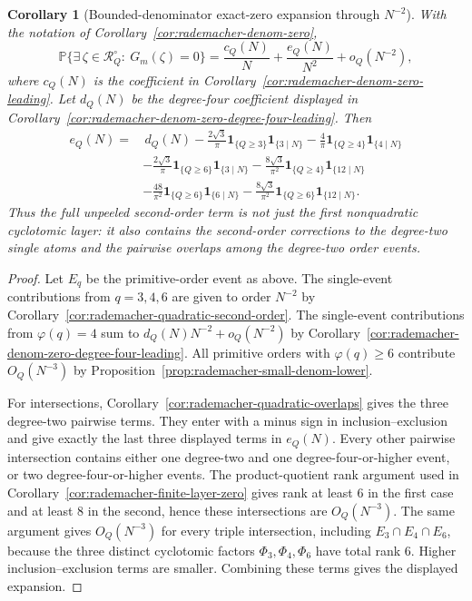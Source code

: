 \documentclass[11pt]{amsart}
\numberwithin{equation}{section}
\newtheorem{corollary}[theorem]{Corollary}
\theoremstyle{definition}
\theoremstyle{remark}
\newcommand{\Prob}{\mathbb P}
\begin{document}
\begin{corollary}[Bounded-denominator exact-zero expansion through \(N^{-2}\)]
\label{cor:rademacher-denom-zero-second-order}
With the notation of Corollary~\ref{cor:rademacher-denom-zero},
\[
  \Prob\{\exists\,\zeta\in\mathcal R_Q^\circ:\ G_m(\zeta)=0\}
  =\frac{c_Q(N)}{N}+\frac{e_Q(N)}{N^2}+o_Q(N^{-2}),
\]
where \(c_Q(N)\) is the coefficient in
Corollary~\ref{cor:rademacher-denom-zero-leading}.  Let \(d_Q(N)\) be the
degree-four coefficient displayed in
Corollary~\ref{cor:rademacher-denom-zero-degree-four-leading}.  Then
\[
\begin{aligned}
  e_Q(N)=&\,d_Q(N)
  -\frac{2\sqrt3}{\pi}\mathbf1_{\{Q\ge3\}}\mathbf1_{\{3\mid N\}}
  -\frac4\pi\mathbf1_{\{Q\ge4\}}\mathbf1_{\{4\mid N\}}  \\
  &-\frac{2\sqrt3}{\pi}\mathbf1_{\{Q\ge6\}}\mathbf1_{\{3\mid N\}}
  -\frac{8\sqrt3}{\pi^2}\mathbf1_{\{Q\ge4\}}\mathbf1_{\{12\mid N\}} \\
  &-\frac{48}{\pi^2}\mathbf1_{\{Q\ge6\}}\mathbf1_{\{6\mid N\}}
  -\frac{8\sqrt3}{\pi^2}\mathbf1_{\{Q\ge6\}}\mathbf1_{\{12\mid N\}} .
\end{aligned}
\]
Thus the full unpeeled second-order term is not just the first nonquadratic
cyclotomic layer: it also contains the second-order corrections to the
degree-two single atoms and the pairwise overlaps among the degree-two order
events.
\end{corollary}

\begin{proof}
Let \(E_q\) be the primitive-order event as above.  The single-event
contributions from \(q=3,4,6\) are given to order \(N^{-2}\) by
Corollary~\ref{cor:rademacher-quadratic-second-order}.  The single-event
contributions from \(\varphi(q)=4\) sum to \(d_Q(N)N^{-2}+o_Q(N^{-2})\) by
Corollary~\ref{cor:rademacher-denom-zero-degree-four-leading}.  All primitive
orders with \(\varphi(q)\ge6\) contribute \(O_Q(N^{-3})\) by
Proposition~\ref{prop:rademacher-small-denom-lower}.

For intersections, Corollary~\ref{cor:rademacher-quadratic-overlaps} gives the
three degree-two pairwise terms.  They enter with a minus sign in
inclusion--exclusion and give exactly the last three displayed terms in
\(e_Q(N)\).  Every other pairwise intersection contains either one degree-two
and one degree-four-or-higher event, or two degree-four-or-higher events.  The
product-quotient rank argument used in
Corollary~\ref{cor:rademacher-finite-layer-zero} gives rank at least \(6\) in
the first case and at least \(8\) in the second, hence these intersections are
\(O_Q(N^{-3})\).  The same argument gives \(O_Q(N^{-3})\) for every triple
intersection, including \(E_3\cap E_4\cap E_6\), because the three distinct
cyclotomic factors \(\Phi_3,\Phi_4,\Phi_6\) have total rank \(6\).  Higher
inclusion--exclusion terms are smaller.  Combining these terms gives the
displayed expansion.
\end{proof}
\end{document}
